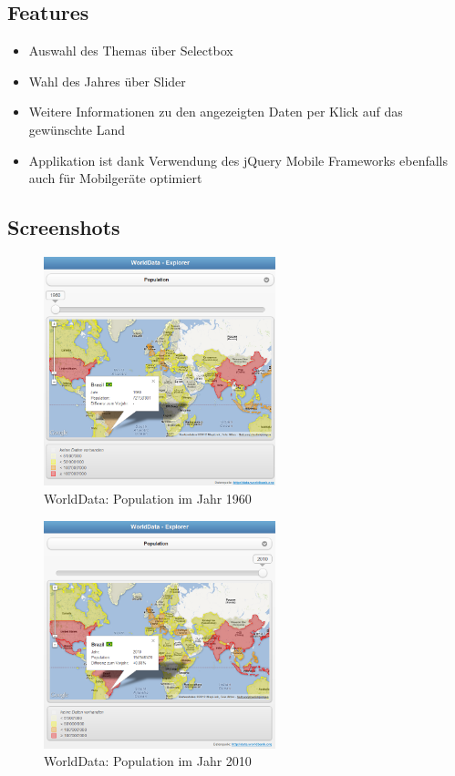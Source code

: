 \subsection{Features}
\begin{itemize}
\item Auswahl des Themas über Selectbox
\item Wahl des Jahres über Slider
\item Weitere Informationen zu den angezeigten Daten per Klick auf das gewünschte Land
\item Applikation ist dank Verwendung des jQuery Mobile Frameworks ebenfalls auch für Mobilgeräte optimiert
\end{itemize}

\subsection{Screenshots}
\begin{figure}[H]
	\centering
	\includegraphics[width=0.6\textwidth]{images/usecase1-worlddata/screenshots/worlddata-screenshots-population_1960}
	\caption{WorldData: Population im Jahr 1960}
	\label{worlddata-screenshots-population_1960}
\end{figure}

\begin{figure}[H]
	\centering
	\includegraphics[width=0.6\textwidth]{images/usecase1-worlddata/screenshots/worlddata-screenshots-population_2010}
	\caption{WorldData: Population im Jahr 2010}
	\label{worlddata-screenshots-population_2010}
\end{figure}

